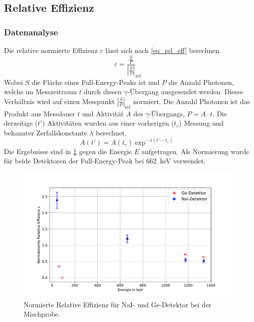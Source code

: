 \documentclass[
	a4paper,
	12pt,
	pagesize,
	ngerman
]{scrartcl}
\begin{document}
\subsection{Relative Effizienz}
\subsubsection{Datenanalyse}
Die relative normierte Effizienz $\varepsilon$ lässt sich nach \cref{eq_rel_eff} berechnen.
\begin{equation}
	\label{eq_rel_eff}
	\varepsilon = \frac{\frac{S}{P}}{\left|\frac{S}{P}\right|}_{\text{ref}}
\end{equation}
Wobei $S$ die Fläche eines Full-Energy-Peaks ist und $P$ die Anzahl Photonen, welche im Messzeitraum $t$ durch diesen $\gamma$-Übergang ausgesendet werden.
Dieses Verhältnis wird auf einen Messpunkt $\left|\frac{S}{P}\right|_{\text{ref}}$ normiert.
Die Anzahl Photonen ist das Produkt aus Messdauer $t$ und Aktivität $A$ des $\gamma$-Übergangs, $P=A\cdot t$.
Die derzeitige ($t'$) Aktivitäten wurden aus einer vorherigen ($t_r$) Messung und bekannter Zerfallskonstante $\lambda$ berechnet.
\begin{equation}
	A(t') = A(t_r)\exp^{-\lambda (t'-t_r)}
\end{equation}
Die Ergebnisse sind in \cref{fg_eff} gegen die Energie $E$ aufgetragen.
Als Normierung wurde für beide Detektoren der Full-Energy-Peak bei \SI{662}{keV} verwendet.

	\begin{figure}[H]
			\includegraphics[width= 1 \linewidth]{img/eff}
			\caption{
			Normierte Relative Effizienz für NaI- und Ge-Detektor bei der Mischprobe.
			}
			\label{fg_eff}
	\end{figure}
\end{document}
